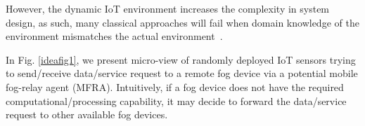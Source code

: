 \documentclass[journal]{IEEEtran}
\begin{document}
However, the dynamic IoT environment increases the complexity in system design, as such, many classical approaches will fail when domain knowledge of the environment mismatches the actual environment~\cite{Yau2012}.

 In Fig. \ref{ideafig1}, we present micro-view of randomly deployed IoT sensors trying to send/receive data/service request to a remote fog device via a potential mobile fog-relay agent (MFRA). Intuitively, if a fog device does not have the required computational/processing capability, it may decide to forward the data/service request to other available fog devices.



\end{document}
